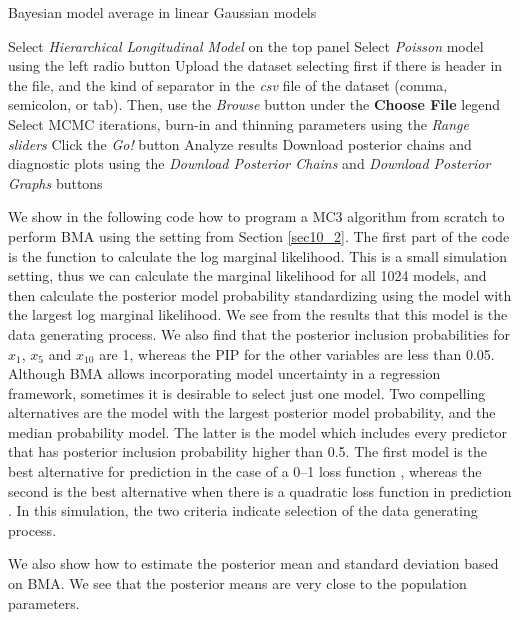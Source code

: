 \begin{algorithm}[h!]
	\caption{Bayesian model average in linear Gaussian models}\label{alg:BMAnormal}
	\begin{algorithmic}[1]  		 			
		\State Select \textit{Hierarchical Longitudinal Model} on the top panel
		\State Select \textit{Poisson} model using the left radio button
		\State Upload the dataset selecting first if there is header in the file, and the kind of separator in the \textit{csv} file of the dataset (comma, semicolon, or tab). Then, use the \textit{Browse} button under the \textbf{Choose File} legend
		\State Select MCMC iterations, burn-in and thinning parameters using the \textit{Range sliders}
		\State Click the \textit{Go!} button
		\State Analyze results
		\State Download posterior chains and diagnostic plots using the \textit{Download Posterior Chains} and \textit{Download Posterior Graphs} buttons
	\end{algorithmic} 
\end{algorithm}


We show in the following code how to program a MC3 algorithm from scratch to perform BMA using the setting from Section \ref{sec10_2}. The first part of the code is the function to calculate the log marginal likelihood. This is a small simulation setting, thus we can calculate the marginal likelihood for all 1024 models, and then calculate the posterior model probability standardizing using the model with the largest log marginal likelihood. We see from the results that this model is the data generating process. We also find that the posterior inclusion probabilities for $x_{1}$, $x_{5}$ and $x_{10}$ are 1, whereas the PIP for the other variables are less than 0.05. Although BMA allows incorporating model uncertainty in a regression framework, sometimes it is desirable to select just one model. Two compelling alternatives are the model with the largest posterior model probability, and the median probability model. The latter is the model which includes every predictor that has posterior inclusion probability higher than 0.5. The first model is the best alternative for prediction in the case of a 0--1 loss function \cite{Clyde2004}, whereas the second is the best alternative when there is a quadratic loss function in prediction \cite{Barbieri2004}. In this simulation, the two criteria indicate selection of the data generating process.

We also show how to estimate the posterior mean and standard deviation based on BMA. We see that the posterior means are very close to the population parameters.  

